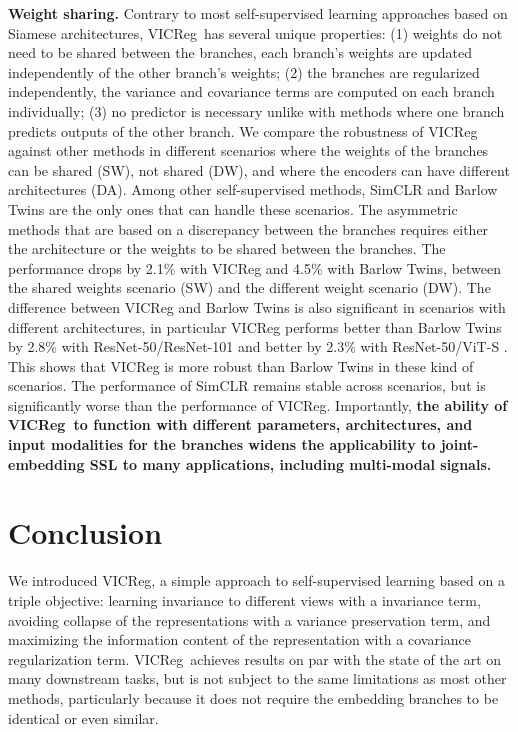 \documentclass{article}
\newcommand{\algo}{VICReg}
\begin{document}
\textbf{Weight sharing.} \label{sec:non-shared} 
Contrary to most self-supervised learning approaches based on Siamese architectures, \algo \ has several unique properties: (1) weights do not need to be shared between the branches, each branch's weights are updated independently of the other branch's weights; (2) the branches are regularized independently, the variance and covariance terms are computed on each branch individually; (3) no predictor is necessary unlike with methods where one branch predicts outputs of the other branch. We compare the robustness of VICReg against other methods in different scenarios where the weights of the branches can be shared (SW), not shared (DW), and where the encoders can have different  architectures (DA). Among other self-supervised methods, SimCLR and Barlow Twins are the only ones that can handle these scenarios. The asymmetric methods that are based on a discrepancy between the branches requires either the architecture or the weights to be shared between the branches. The performance drops by 2.1\% with VICReg and 4.5\% with Barlow Twins, between the shared weights scenario (SW) and the different weight scenario (DW). The difference between VICReg and Barlow Twins is also significant in scenarios with different architectures, in particular VICReg performs better than Barlow Twins by 2.8\% with ResNet-50/ResNet-101 and better by 2.3\% with ResNet-50/ViT-S \cite{dosovitskiy2021vit}. This shows that VICReg is more robust than Barlow Twins in these kind of scenarios. The performance of SimCLR remains stable across scenarios, but is significantly worse than the performance of VICReg. Importantly, {\bf the ability of \algo \ to function with different parameters, architectures, and input modalities for the branches widens the applicability to joint-embedding SSL to many applications, including multi-modal signals.}





\section{Conclusion} \label{sec:conclusion}
We introduced \algo, a simple approach to self-supervised learning based on a triple objective: learning invariance to different views with a invariance term, avoiding collapse of the representations with a variance preservation term, and maximizing the information content of the representation with a covariance regularization term. \algo \ achieves results on par with the state of the art on many downstream tasks, but is not subject to the same limitations as most other methods, particularly because it does not require the embedding branches to be identical or even similar.
\end{document}
